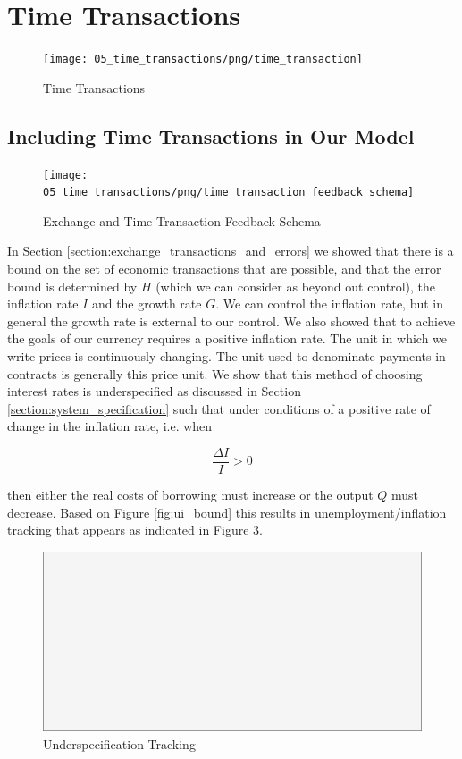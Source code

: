 \section{Time Transactions}
\label{section:time_transactions}

\begin{figure}[H]
\centering
\texttt{[image: 05\_time\_transactions/png/time\_transaction]}
\caption{Time Transactions}
\label{fig:time_transactions2}
\end{figure}

\subsection{Including Time Transactions in Our Model}

\begin{figure}[H]
\centering
\texttt{[image: 05\_time\_transactions/png/time\_transaction\_feedback\_schema]}
\caption{Exchange and Time Transaction Feedback Schema}
\label{fig:exchange_and_time_transaction_schema1}
\end{figure}

In Section \ref{section:exchange_transactions_and_errors} we showed that there is a bound on the set of
economic transactions that are possible, and that the error bound is determined by $H$ (which we can
consider as beyond out control), the inflation rate $I$ and the growth rate $G$. We can control the
inflation rate, but in general the growth rate is external to our control. We also showed that to
achieve the goals of our currency requires a positive inflation rate. The unit in which we write
prices is continuously changing. The unit used to denominate payments in contracts is generally this
price unit. We show that this method of choosing interest rates is underspecified as discussed in
Section \ref{section:system_specification} such that under conditions of a positive rate of change
in the inflation rate, i.e. when

\[
    \frac {\Delta I} I > 0
\]

then either the real costs of borrowing must increase or the output $Q$ must decrease. Based on   
Figure \ref{fig:ui_bound} this results in unemployment/inflation tracking that appears as indicated
in Figure \ref{fig:underspecification_problem}.

\begin{figure}[H]
\centering
\includegraphics[scale=0.48]{blank}
\caption{Underspecification Tracking}
\label{fig:underspecification_problem}
\end{figure}

